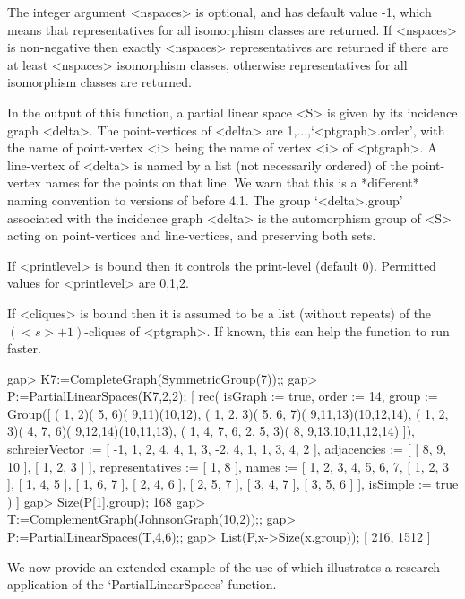 The integer argument <nspaces> is optional, and has default value -1,
which means that representatives for all isomorphism classes are
returned. If <nspaces> is non-negative then exactly <nspaces>
representatives are returned if there are at least <nspaces>
isomorphism classes, otherwise representatives for all isomorphism
classes are returned.

In the output of this function, a partial linear space <S> is given
by its incidence graph <delta>. The point-vertices of <delta> are
1,...,`<ptgraph>.order', with the name of point-vertex <i> being the
name of vertex <i> of <ptgraph>. A line-vertex of <delta> is named by a
list (not necessarily ordered) of the point-vertex names for the points
on that line.  We warn that this is a *different* naming convention to
versions of {\GRAPE} before 4.1.  The group `<delta>.group' associated
with the incidence graph <delta> is the automorphism group of <S> acting
on point-vertices and line-vertices, and preserving both sets.

If <printlevel> is bound then it controls the print-level (default 0).
Permitted values for <printlevel> are 0,1,2.

If <cliques> is bound then it is assumed to be a list (without repeats)
of the $(<s>+1)$-cliques of <ptgraph>. If known, this can help the
function to run faster.

\beginexample
gap> K7:=CompleteGraph(SymmetricGroup(7));;
gap> P:=PartialLinearSpaces(K7,2,2);
[ rec( isGraph := true, order := 14, 
      group := Group([ ( 1, 2)( 5, 6)( 9,11)(10,12), 
          ( 1, 2, 3)( 5, 6, 7)( 9,11,13)(10,12,14), 
          ( 1, 2, 3)( 4, 7, 6)( 9,12,14)(10,11,13), 
          ( 1, 4, 7, 6, 2, 5, 3)( 8, 9,13,10,11,12,14) ]), 
      schreierVector := [ -1, 1, 2, 4, 4, 1, 3, -2, 4, 1, 1, 3, 4, 2 ], 
      adjacencies := [ [ 8, 9, 10 ], [ 1, 2, 3 ] ], 
      representatives := [ 1, 8 ], 
      names := [ 1, 2, 3, 4, 5, 6, 7, [ 1, 2, 3 ], [ 1, 4, 5 ], [ 1, 6, 7 ], 
          [ 2, 4, 6 ], [ 2, 5, 7 ], [ 3, 4, 7 ], [ 3, 5, 6 ] ], 
      isSimple := true ) ]
gap> Size(P[1].group);
168
gap> T:=ComplementGraph(JohnsonGraph(10,2));;
gap> P:=PartialLinearSpaces(T,4,6);;
gap> List(P,x->Size(x.group));
[ 216, 1512 ]
\endexample


We now provide an extended example of the use of {\GRAPE} which
illustrates a research application of the `PartialLinearSpaces' function.


